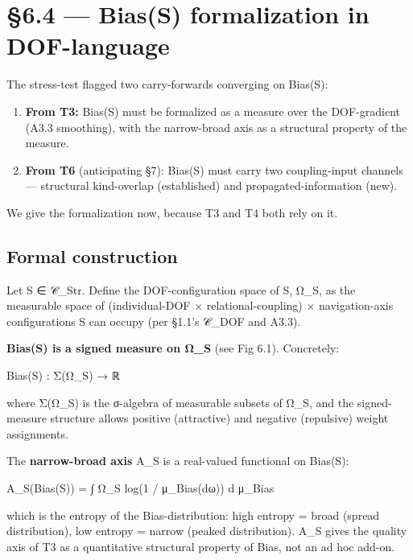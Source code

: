 \documentclass[11pt, openany]{book}
\newcommand{\sectionbreak}{\clearpage}
\begin{document}
\sectionbreak

\section{§6.4 --- Bias(S) formalization in DOF-language}

The stress-test flagged two carry-forwards converging on Bias(S):

\begin{enumerate}
\item \textbf{From T3:} Bias(S) must be formalized as a measure over the DOF-gradient (A3.3 smoothing), with the narrow-broad axis as a structural property of the measure.
\item \textbf{From T6} (anticipating §7): Bias(S) must carry two coupling-input channels --- structural kind-overlap (established) and propagated-information (new).
\end{enumerate}

We give the formalization now, because T3 and T4 both rely on it.

\subsection{Formal construction}

Let S ∈ 𝒞\_\allowbreak{}Str. Define the DOF-configuration space of S, Ω\_\allowbreak{}S, as the measurable space of (individual-DOF × relational-coupling) × navigation-axis configurations S can occupy (per §1.1's 𝒞\_\allowbreak{}DOF and A3.3).

\textbf{Bias(S) is a signed measure on Ω\_\allowbreak{}S} (see Fig 6.1). Concretely:

\begin{Code}
Bias(S) : Σ(Ω_S) → ℝ
\end{Code}

where Σ(Ω\_\allowbreak{}S) is the σ-algebra of measurable subsets of Ω\_\allowbreak{}S, and the signed-measure structure allows positive (attractive) and negative (repulsive) weight assignments.

The \textbf{narrow-broad axis} A\_\allowbreak{}S is a real-valued functional on Bias(S):

\begin{Code}
A_S(Bias(S)) = ∫ Ω_S log(1 / μ_Bias(dω)) d μ_Bias
\end{Code}

which is the entropy of the Bias-distribution: high entropy = broad (spread distribution), low entropy = narrow (peaked distribution). A\_\allowbreak{}S gives the quality axis of T3 as a quantitative structural property of Bias, not an ad hoc add-on.
\end{document}
